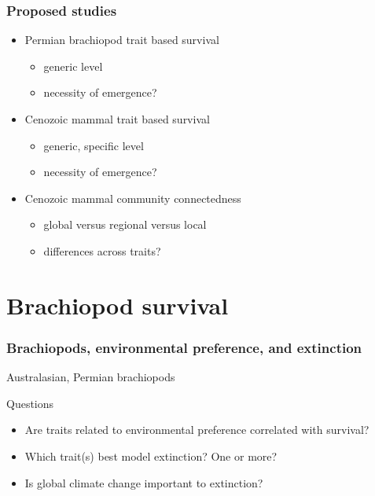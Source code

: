 \documentclass{beamer}
\begin{document}
\begin{frame}
  \frametitle{Proposed studies}

  \begin{itemize}
    \item Permian brachiopod trait based survival %
      \begin{itemize}
        \item generic level 
        \item necessity of emergence?
      \end{itemize}
    \item Cenozoic mammal trait based survival %
      \begin{itemize}
        \item generic, specific level 
        \item necessity of emergence?
      \end{itemize}
    \item Cenozoic mammal community connectedness %
      \begin{itemize}
        \item global versus regional versus local
        \item differences across traits?
      \end{itemize}
  \end{itemize}
\end{frame}


\section{Brachiopod survival}

\begin{frame}
  \frametitle{Brachiopods, environmental preference, and extinction}

  \begin{center}
    Australasian, Permian brachiopods
  \end{center}

  \vspace{0.75cm}

  \begin{block}{Questions}
    \begin{itemize}
      \item Are traits related to environmental preference correlated with survival?
      \item Which trait(s) best model extinction? One or more?
      \item Is global climate change important to extinction?
    \end{itemize}
  \end{block}
\end{frame}
\end{document}

